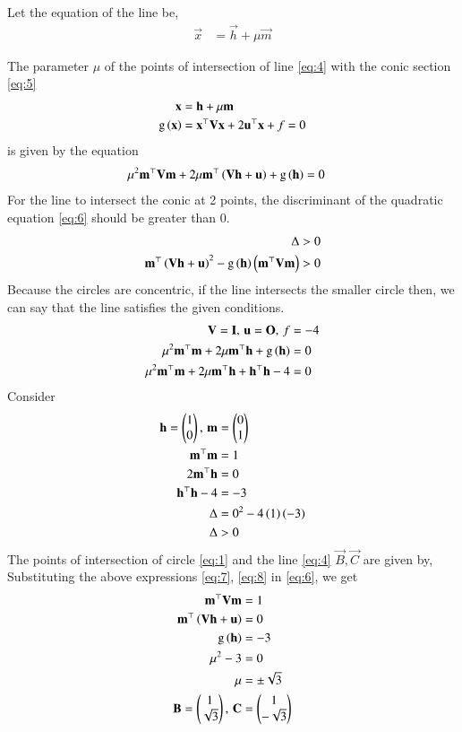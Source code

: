\documentclass[journal,12pt,twocolumn]{IEEEtran}
\begin{document}
\begin{enumerate}
Let the equation of the line be,
\begin{align}
\vec{x} &= \vec{h} + \mu \vec{m}
\end{align}

The parameter $\mu$ of the points of intersection of line \eqref{eq:4} with the conic section \eqref{eq:5}
\begin{align}
\mathbf{x} &= \mathbf{h} + \mu \mathbf{m}
\label{eq:4}\\
\text{g}\left(\mathbf{x}\right) &= \mathbf{x}^{\top}\mathbf{V}\mathbf{x}+2\mathbf{u}^{\top}\mathbf{x}+f=0
\label{eq:5}
\end{align}
is given by the equation 
\begin{align}
\mu^2\mathbf{m}^{\top}\mathbf{V}\mathbf{m} + 2 \mu\mathbf{m}^{\top}\left(\mathbf{V}\mathbf{h}+\mathbf{u}\right) 
	+ \text{g}\left(\mathbf{h}\right) &=0
\label{eq:6}
\end{align}
For the line to intersect the conic at 2 points, the discriminant of the quadratic equation \eqref{eq:6} should be greater than 0.
\begin{align}
\Delta &> 0\\
{\mathbf{m}^{\top}\left(\mathbf{V}\mathbf{h}+\mathbf{u}\right)}^2-\text{g}\left(\mathbf{h}\right)\left(\mathbf{m}^{\top}\mathbf{V}\mathbf{m}\right) &> 0
\end{align}
Because the circles are concentric, if the line intersects the smaller circle then, we can say that the line satisfies the given conditions.
\begin{align}
\mathbf{V} = \mathbf{I}, \, \mathbf{u} = \mathbf{O}, \, f &= -4
\label{eq:7}\\
\mu^2\mathbf{m}^{\top}\mathbf{m} + 2 \mu\mathbf{m}^{\top}\mathbf{h} 
	+ \text{g}\left(\mathbf{h}\right) &=0\\
\mu^2\mathbf{m}^{\top}\mathbf{m} + 2 \mu\mathbf{m}^{\top}\mathbf{h} 
	+ \mathbf{h}^{\top}\mathbf{h}-4 &=0\\	
\label{eq:8}
\end{align} 
Consider
\begin{align}
\mathbf{h} = \begin{pmatrix}1\\0\end{pmatrix}, \, \mathbf{m} &= \begin{pmatrix}0\\1\end{pmatrix}\\
\mathbf{m}^{\top}\mathbf{m} &=1 \\
2\mathbf{m}^\top\mathbf{h} &= 0\\
\mathbf{h}^\top\mathbf{h}-4 &= -3\\
\Delta &= 0^2 - 4\left(1\right)\left(-3\right)\\
\Delta &> 0
\end{align}
The points of intersection of circle \eqref{eq:1} and the line \eqref{eq:4} $\vec{B},\vec{C}$ are given by,
Substituting the above expressions \eqref{eq:7}, \eqref{eq:8} in \eqref{eq:6}, we get
\begin{align}
\mathbf{m}^{\top}\mathbf{V}\mathbf{m} & = 1\\
\mathbf{m}^{\top}\left(\mathbf{V}\mathbf{h}+\mathbf{u}\right) &= 0 \\
\text{g}\left(\mathbf{h}\right) &= -3\\
\mu ^2 - 3 &= 0\\
\mu &= \pm \sqrt{3}\\
\mathbf{B} = \begin{pmatrix}1\\\sqrt{3}\end{pmatrix}, \, \mathbf{C} &= \begin{pmatrix}1\\-\sqrt{3}\end{pmatrix}
\end{align}


\end{enumerate}
\end{document}
